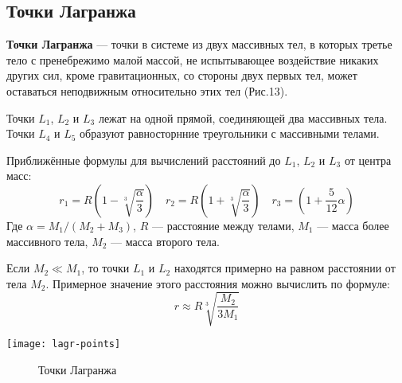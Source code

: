 \subsection{Точки Лагранжа}

\textbf{Точки Лагранжа} --- точки в системе из двух массивных тел, в которых третье тело с пренебрежимо малой массой, не испытывающее воздействие никаких других сил, кроме гравитационных, со стороны двух первых тел, может оставаться неподвижным относительно этих тел (Рис.13).

Точки $L_1$, $L_2$ и $L_3$ лежат на одной прямой, соединяющей два массивных тела. Точки $L_4$ и $L_5$ образуют равносторнние треугольники с массивными телами.

Приближённые формулы для вычислений расстояний до $L_1$, $L_2$ и $L_3$ от центра масс:
\begin{equation}r_1=R\left(1-\sqrt[3]{\frac{\alpha}{3}}\right) \quad r_2=R\left(1+\sqrt[3]{\frac{\alpha}{3}}\right) \quad r_3=\left(1+\frac{5}{12}\alpha\right)
\end{equation}
Где $\alpha=M_1/(M_2+M_3)$, $R$ --- расстояние между телами, $M_1$ --- масса более массивного тела, $M_2$ --- масса второго тела.

Если $M_2\ll M_1$, то точки $L_1$ и $L_2$ находятся примерно на равном расстоянии от тела $M_2$. Примерное значение этого расстояния можно вычислить по формуле:
\begin{equation}r\approx R\sqrt[3]{\frac{M_2}{3M_1}}
\end{equation}
\begin{center}
\texttt{[image: lagr-points]}
\begin{figure}[h!]
\caption{Точки Лагранжа}
\end{figure}
\end{center}